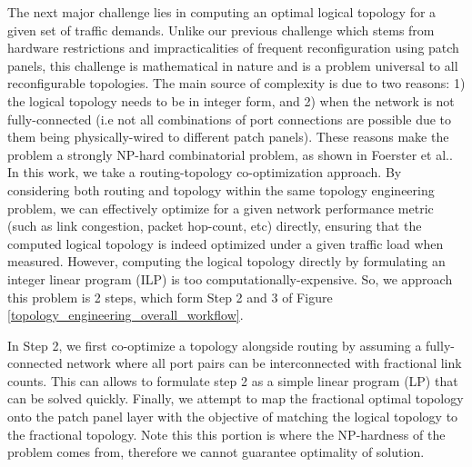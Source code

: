 \documentclass[sigconf]{acmart}
\theoremstyle{definition}
\begin{document}
The next major challenge lies in computing an optimal logical topology for a given set of traffic demands. Unlike our previous challenge which stems from hardware restrictions and impracticalities of frequent reconfiguration using patch panels, this challenge is mathematical in nature and is a problem universal to all reconfigurable topologies. The main source of complexity is due to two reasons: 1) the logical topology needs to be in integer form, and 2) when the network is not fully-connected (i.e not all combinations of port connections are possible due to them being physically-wired to different patch panels). These reasons make the problem a strongly NP-hard combinatorial problem, as shown in Foerster et al.\cite{foerster2018characterizing}. In this work, we take a routing-topology co-optimization approach. By considering both routing and topology within the same topology engineering problem, we can effectively optimize for a given network performance metric (such as link congestion, packet hop-count, etc) directly, ensuring that the computed logical topology is indeed optimized under a given traffic load when measured. However, computing the logical topology directly by formulating an integer linear program (ILP) is too computationally-expensive. So, we approach this problem is 2 steps, which form Step 2 and 3 of Figure \ref{topology_engineering_overall_workflow}.

In Step 2, we first co-optimize a topology alongside routing by assuming a fully-connected network where all port pairs can be interconnected with fractional link counts. This can allows to formulate step 2 as a simple linear program (LP) that can be solved quickly. Finally, we attempt to map the fractional optimal topology onto the patch panel layer with the objective of matching the logical topology to the fractional topology. Note this this portion is where the NP-hardness of the problem comes from, therefore we cannot guarantee optimality of solution.
\end{document}
